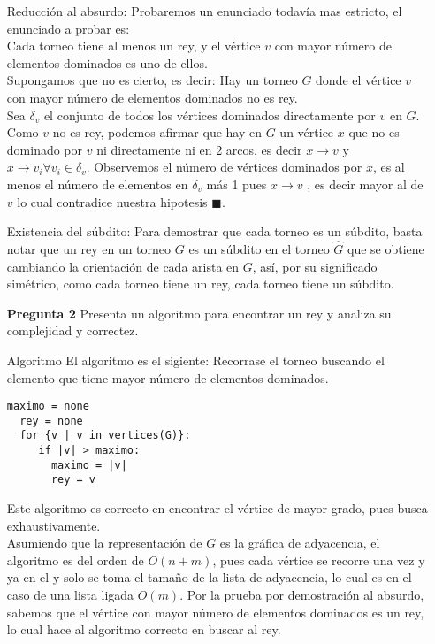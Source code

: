 \documentclass[12pt]{article}
\begin{document}
\begin{itemize}
  \item[Reducción al absurdo:]
    Probaremos un enunciado todavía mas estricto, el enunciado a probar es: \\
Cada torneo tiene al menos un rey, y el vértice $v$ con mayor número de elementos dominados es uno de ellos.\\
    Supongamos que no es cierto, es decir: Hay un torneo $G$ donde el vértice $v$ con mayor número de elementos dominados no es rey. \\
    Sea $\delta_{v}$ el conjunto de todos los vértices dominados directamente por $v$ en $G$.\\
    Como $v$ no es rey, podemos afirmar que hay en $G$ un vértice $x$ que no es dominado por $v$ ni directamente ni en 2 arcos, es decir $ x \rightarrow v$  y 
$ x \rightarrow v_{i} \forall v_{i} \in \delta_{v} $. Observemos el número de vértices dominados por $x$, es al menos el número de elementos en $\delta_{v}$ más 1  pues $x \rightarrow v$ , es decir mayor al de $v$ lo cual contradice nuestra hipotesis  $\blacksquare$.\\

\item[Existencia del súbdito:]
Para demostrar que cada torneo es un súbdito, basta notar que un rey en un torneo $G$ es un súbdito en el torneo $\widehat G$ que se obtiene cambiando la orientación de cada arista en $G$, así, por su significado simétrico, como cada torneo tiene un rey, cada torneo tiene un súbdito.\\

\item[\bf{Pregunta 2}] Presenta un algoritmo para encontrar un rey y analiza su complejidad y correctez.

\item[Algoritmo]
  El algoritmo es el sigiente:
  Recorrase el torneo buscando el elemento que tiene mayor número de elementos dominados.

\begin{lstlisting}[frame=single] 
  maximo = none
  rey = none
  for {v | v in vertices(G)}:
     if |v| > maximo:
       maximo = |v|
       rey = v
\end{lstlisting}
Este algoritmo es correcto en encontrar el vértice de mayor grado, pues busca exhaustivamente.\\
Asumiendo que la representación de $G$ es la gráfica de adyacencia, el algoritmo es del orden de $O(n + m)$, pues cada vértice se recorre una vez y ya en el y solo se toma el tamaño de la lista de adyacencia, lo cual es en el caso de una lista ligada $O(m)$.
Por la prueba por demostración al absurdo, sabemos que el vértice con mayor número de elementos dominados es un rey, lo cual hace al algoritmo correcto en buscar al rey.


\end{itemize}
\end{document}
